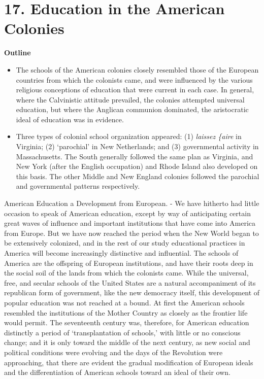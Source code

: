 \documentclass[]{book}
\providecommand{\tightlist}{%
  \setlength{\itemsep}{0pt}\setlength{\parskip}{0pt}}
\begin{document}
\hypertarget{education-in-the-american-colonies}{%
\chapter{17. Education in the American Colonies}\label{education-in-the-american-colonies}}

\textbf{Outline}

\begin{itemize}
\tightlist
\item
  The schools of the American colonies closely resembled those of the European countries from which the colonists came, and were influenced by the various religious conceptions of education that were current in each case. In general, where the Calvinistic attitude prevailed, the colonies attempted universal education, but where the Anglican communion dominated, the aristocratic ideal of education was in evidence.
\item
  Three types of colonial school organization appeared: (1) \emph{laissez \{aire} in Virginia; (2) `parochial' in New Netherlands; and (3) governmental activity in Massachusetts. The South generally followed the same plan as Virginia, and New York (after the English occupation) and Rhode Island also developed on this basis. The other Middle and New England colonies followed the parochial and governmental patterns respectively.
\end{itemize}

American Education a Development from European. - We have hitherto had little occasion to speak of American education, except by way of anticipating certain great waves of influence and important institutions that have come into America from Europe. But we have now reached the period when the New World began to be extensively colonized, and in the rest of our study educational practices in America will become increasingly distinctive and influential. The schools of America are the offspring of European institutions, and have their roots deep in the social soil of the lands from which the colonists came. While the universal, free, and secular schools of the United States are a natural accompaniment of its republican form of government, like the new democracy itself, this development of popular education was not reached at a bound. At first the American schools resembled the institutions of the Mother Country as closely as the frontier life would permit. The seventeenth century was, therefore, for American education distinctly a period of `transplantation of schools,' with little or no conscious change; and it is only toward the middle of the next century, as new social and political conditions were evolving and the days of the Revolution were approaching, that there are evident the gradual modification of European ideals and the differentiation of American schools toward an ideal of their own.
\end{document}
